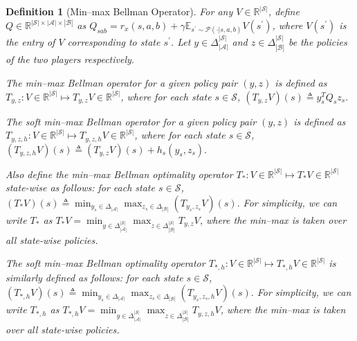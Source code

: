 \documentclass[10pt,a4paper]{amsart}
\newtheorem{definition}{Definition}
\def\R{\mathbb R}
\def\bydef{\triangleq}
\def\cA{\mathcal A}
\def\cB{\mathcal B}
\def\cP{\mathcal P}
\def\cS{\mathcal S}
\begin{document}
\begin{definition}[Min--max Bellman Operator]
    \label{definition: min-max-bellman-operator}
    For any $V \in \mathbb{R}^{|\mathcal{S}|}$, define $Q \in \mathbb{R}^{|\mathcal{S}| \times |\mathcal{A}| \times |\mathcal{B}|}$ as $Q_{sab} = r_x(s,a,b) + \gamma \mathbb{E}_{s^\prime \sim \cP(\cdot|s,a,b)} V(s^\prime)$, where $V(s^\prime)$ is the entry of $V$ corresponding to state $s^\prime$. Let $y \in \Delta^{|\cS|}_{|\cA|}$ and $z \in \Delta^{|\cS|}_{|\cB|}$ be the policies of the two players respectively.

    The min--max Bellman operator for a given policy pair $(y,z)$ is defined as
    $T_{y,z}: V \in \mathbb{R}^{|\mathcal{S}|} \mapsto T_{y,z} V \in \mathbb{R}^{|\mathcal{S}|}$,
    where for each state $s\in \mathcal{S}$,
    $(T_{y,z} V)(s) \bydef y_s^T Q_s z_s.$

    The soft min--max Bellman operator for a given policy pair $(y,z)$ is defined as
    $T_{y,z,h}: V \in \mathbb{R}^{|\mathcal{S}|} \mapsto  T_{y,z,h} V \in \mathbb{R}^{|\mathcal{S}|}$,
    where for each state $s\in \mathcal{S}$,
    $\left(T_{y,z,h} V\right)(s)  \bydef \left(T_{y,z} V\right)(s) + h_s(y_s,z_s).$

    Also define the min--max Bellman optimality operator $ T_{*}: V \in \mathbb{R}^{|\mathcal{S}|} \mapsto T_{*} V \in \R^{|\cS|}$ state-wise as follows: for each state $s\in \mathcal{S}$,
    $\left(T_{*} V\right)(s) \bydef \min_{y_s \in \Delta_{|\cA|}} \max_{z_s \in \Delta_{|\cB|}} \left(T_{y_s,z_s} V\right)(s).$ For simplicity, we can write $T_{*}$ as $T_{*} V = \min_{y \in \Delta_{|\cA|}^{|\cS|}} \max_{z \in \Delta_{|\cB|}^{|\cS|}} T_{y,z} V$, where the min--max is taken over all state-wise policies.

    The soft min--max Bellman optimality operator $T_{*,h}: V \in \mathbb{R}^{|\mathcal{S}|} \mapsto T_{*,h} V \in \mathbb{R}^{|\mathcal{S}|}$ is similarly defined as follows: for each state $s\in \mathcal{S}$, $\left(T_{*,h} V\right)(s) \bydef \min_{y_s \in \Delta_{|\cA|}} \max_{z_s \in \Delta_{|\cB|}} \left(T_{y_s,z_s,h} V\right)(s).$ For simplicity, we can write $T_{*,h}$ as $T_{*,h} V = \min_{y \in \Delta_{|\cA|}^{|\cS|}} \max_{z \in \Delta_{|\cB|}^{|\cS|}} T_{y,z,h} V$, where the min--max is taken over all state-wise policies.
\end{definition}
\end{document}
